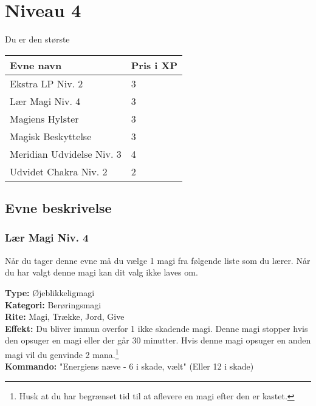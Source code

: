 \chapter{Niveau 4}
Du er den største 

\begin{table}[H]
    \centering
    \begin{tabular}{|p{}|p{}|}
    \rowcolor{cerulean!80}\hline
        Evne navn & Pris i XP \\\hline
        Ekstra LP Niv. 2 & 3 \\\hline
        Lær Magi Niv. 4 & 3 \\\hline
        Magiens Hylster  & 3 \\\hline
        Magisk Beskyttelse & 3\\\hline
        Meridian Udvidelse Niv. 3 & 4 \\\hline
        Udvidet Chakra Niv. 2 & 2 \\\hline
    \end{tabular}
\end{table}

\section{Evne beskrivelse}



\subsection{Lær Magi Niv. 4}
Når du tager denne evne må du vælge 1 magi fra følgende liste som du lærer. Når du har valgt denne magi kan dit valg ikke laves om.

\begin{lærmagi*}
\textbf{Type:} Øjeblikkeligmagi\\
\textbf{Kategori:} Berøringsmagi\\
\textbf{Rite:} Magi, Trække, Jord, Give\\
\textbf{Effekt:} Du bliver immun overfor 1 ikke skadende magi. Denne magi stopper hvis den opsuger en magi eller der går 30 minutter. Hvis denne magi opsuger en anden magi vil du genvinde 2 mana.\footnote{Husk at du har begrænset tid til at aflevere en magi efter den er kastet.}\\
\textbf{Kommando:} "Energiens næve - 6 i skade, vælt" (Eller 12 i skade)\\
\end{lærmagi*}


